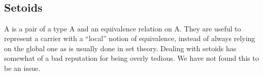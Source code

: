 \begin{code}%
\>[0]\AgdaSpace{}%
\AgdaModule{\AgdaUnderscore{}}\AgdaSpace{}%
\AgdaSymbol{\{}\AgdaSpace{}%
\AgdaSymbol{:}\AgdaSpace{}%
\AgdaSpace{}%
\AgdaSpace{}%
\AgdaSymbol{\}\{}\AgdaSpace{}%
\AgdaSymbol{:}\AgdaSpace{}%
\AgdaSpace{}%
\AgdaSpace{}%
\AgdaSpace{}%
\AgdaSymbol{\}}\AgdaSpace{}%
\<%
\\
\>[0][@{}l@{\AgdaIndent{0}}]%
\>[1]\AgdaSpace{}%
\AgdaSymbol{:}\AgdaSpace{}%
\AgdaFunction{Σ[}\AgdaSpace{}%
\AgdaSpace{}%
\AgdaSpace{}%
\AgdaSpace{}%
\AgdaFunction{]}\AgdaSpace{}%
\AgdaSpace{}%
\AgdaSpace{}%
\AgdaSpace{}%
\<%
\\
%
\>[1]\AgdaSpace{}%
\AgdaSymbol{=}\AgdaSpace{}%
\<%
\\
%
\>[1]\AgdaSpace{}%
\AgdaSymbol{:}\AgdaSpace{}%
\AgdaSymbol{(}\AgdaSpace{}%
\AgdaSymbol{:}\AgdaSpace{}%
\AgdaFunction{Σ[}\AgdaSpace{}%
\AgdaSpace{}%
\AgdaSpace{}%
\AgdaSpace{}%
\AgdaFunction{]}\AgdaSpace{}%
\AgdaSpace{}%
\AgdaSymbol{)}\AgdaSpace{}%
\AgdaSpace{}%
\AgdaSpace{}%
\AgdaSpace{}%
\AgdaSpace{}%
\<%
\\
%
\>[1]\AgdaSpace{}%
\AgdaSymbol{=}\AgdaSpace{}%
\<%
\end{code}
\fi

\subsection{Setoids}\label{setoids}
A  is a pair of a type \ab A and
an equivalence relation  on \ab A.  They are useful to represent a
carrier with a ``local'' notion of equivalence, instead of always relying on
the global one as is usually done in set theory. Dealing with setoids has
somewhat of a bad reputation for being overly tedious. We have not found
this to be an issue.

